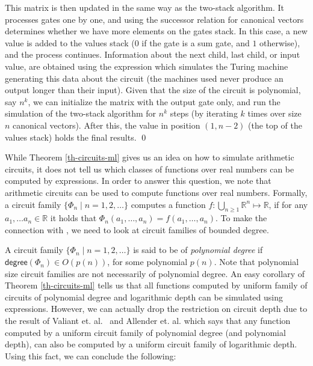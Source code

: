 This matrix is then updated in the same way as the two-stack algorithm. It processes gates one by one, and using the successor relation for canonical vectors determines whether we have more elements on the gates stack. In this case, a new value is added to the values stack ($0$ if the gate is a sum gate, and $1$ otherwise), and the process continues. Information about the next child, last child, or input value, are obtained using the expression which simulates the Turing machine generating this data about the circuit (the machines used never produce an output longer than their input). Given that the size of the circuit is polynomial, say $n^k$, we can initialize the matrix with the output gate only, and run the simulation of the two-stack algorithm for $n^k$ steps (by iterating $k$ times over size $n$ canonical vectors). After this, the value in position  $(1,n-2)$ (the top of the values stack) holds the final results. \qed

\smallskip
While Theorem \ref{th-circuits-ml} gives us an idea on how to simulate arithmetic circuits, it does not tell us which classes of functions over real numbers can be computed by \langfor expressions. In order to answer this question, we note that arithmetic circuits can be used to compute functions over real numbers. Formally, a circuit family $\{\Phi_n\mid n=1,2,\ldots\}$ computes a function $f:\bigcup_{n\geq 1} \mathbb{R}^n\mapsto\mathbb{R}$, if for any $a_1,\ldots a_n\in \mathbb{R}$ it holds that $\Phi_n(a_1,\ldots ,a_n) = f(a_1,\ldots ,a_n)$. To make the connection with \langfor\!, we need to look at circuit families of bounded degree. 

A circuit family $\{\Phi_n\mid n=1,2,\ldots\}$ is said to be of \textit{polynomial degree} if $\mathsf{degree}(\Phi_n)\in O(p(n))$, for some polynomial $p(n)$. Note that polynomial size circuit families are not necessarily of polynomial degree. An easy corollary of Theorem \ref{th-circuits-ml} tells us that all functions computed by uniform family of circuits of polynomial degree and logarithmic depth can be simulated using \langfor expressions. However, we can actually drop the restriction on circuit depth due to the result of Valiant et. al.~\cite{valiant1981fast} and Allender et. al. \cite{AllenderJMV98} which says that any function computed by a uniform circuit family of polynomial degree (and polynomial depth), can also be computed by a uniform circuit family of logarithmic depth. Using this fact, we can conclude the following:

